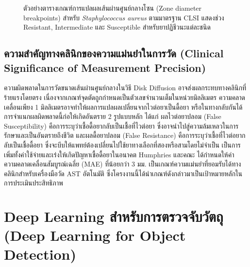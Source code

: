 \begin{figure}[H]
  \centering
  \caption{ตัวอย่างตารางเกณฑ์การแปลผลเส้นผ่านศูนย์กลางโซน (Zone diameter breakpoints) สำหรับ
    \textit{Staphylococcus aureus} ตามมาตรฐาน CLSI แสดงช่วง Resistant, Intermediate และ Susceptible
    สำหรับยาปฏิชีวนะแต่ละชนิด \cite{clsi2025}}
  \label{fig:clsi_table}
\end{figure}

\subsection{ความสำคัญทางคลินิกของความแม่นยำในการวัด (Clinical Significance of Measurement Precision)}

ความผิดพลาดในการวัดขนาดเส้นผ่านศูนย์กลางในวิธี Disk Diffusion อาจส่งผลกระทบทางคลินิกที่ร้ายแรงโดยตรง เนื่องจากเกณฑ์จุดตัดถูกกำหนดเป็นตัวเลขจำนวนเต็มในหน่วยมิลลิเมตร ความคลาดเคลื่อนเพียง 1 มิลลิเมตรอาจทำให้ผลการแปลผลเปลี่ยนจากไวต่อยาเป็นดื้อยา หรือในทางกลับกันได้ การจำแนกผลผิดพลาดนี้ก่อให้เกิดอันตราย 2 รูปแบบหลัก ได้แก่ ผลไวต่อยาปลอม (False Susceptibility) คือการระบุว่าเชื้อดื้อยากลับเป็นเชื้อที่ไวต่อยา ซึ่งอาจนำไปสู่ความล้มเหลวในการรักษาและเป็นอันตรายถึงชีวิต และผลดื้อยาปลอม (False Resistance) คือการระบุว่าเชื้อที่ไวต่อยากลับเป็นเชื้อดื้อยา ซึ่งจะบีบให้แพทย์ต้องเปลี่ยนไปใช้ยาทางเลือกที่สองหรือสามโดยไม่จำเป็น เป็นการเพิ่มทั้งค่าใช้จ่ายและเร่งให้เกิดปัญหาเชื้อดื้อยาในอนาคต Humphries และคณะ \cite{humphries2018} ได้กำหนดให้ค่าความคลาดเคลื่อนสัมบูรณ์เฉลี่ย (MAE) ที่น้อยกว่า 3 มม. เป็นเกณฑ์ความแม่นยำที่ยอมรับได้ทางคลินิกสำหรับเครื่องมือวัด AST อัตโนมัติ ซึ่งโครงงานนี้ได้นำเกณฑ์ดังกล่าวมาเป็นเป้าหมายหลักในการประเมินประสิทธิภาพ

\section{Deep Learning สำหรับการตรวจจับวัตถุ (Deep Learning for Object Detection)}


